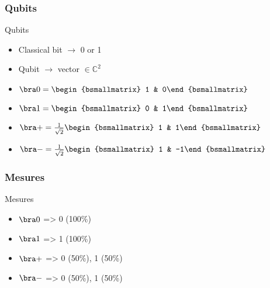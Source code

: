 \documentclass{beamer}
\begin{document}
\subsubsection{Qubits}
\begin{frame}{Qubits}
\begin{linenumbers}
    \begin{itemize}[<+->]
        \item Classical bit $\rightarrow$ 0 or 1
        \item Qubit $\rightarrow$ vector $\in \mathbb{C}^2$
        \item $\bra0 = \begin{bsmallmatrix} 1 & 0\end{bsmallmatrix}$
        \item $\bra1 = \begin{bsmallmatrix} 0 & 1\end{bsmallmatrix}$
        \item $\bra+ = \frac{1}{\sqrt{2}}\begin{bsmallmatrix} 1 & 1\end{bsmallmatrix}$
        \item $\bra- = \frac{1}{\sqrt{2}}\begin{bsmallmatrix} 1 & -1\end{bsmallmatrix}$
    \end{itemize}
\end{linenumbers}
\end{frame}

\subsubsection{Mesures}
\begin{frame}{Mesures}
\begin{linenumbers}
  \begin{itemize}[<+->]
    \item $\bra0$ => 0 (100\%)
    \item $\bra1$ => 1 (100\%)
    \item $\bra+$ => 0 (50\%), 1 (50\%)
    \item $\bra-$ => 0 (50\%), 1 (50\%)
  \end{itemize}
\end{linenumbers}
\end{frame}
\end{document}
